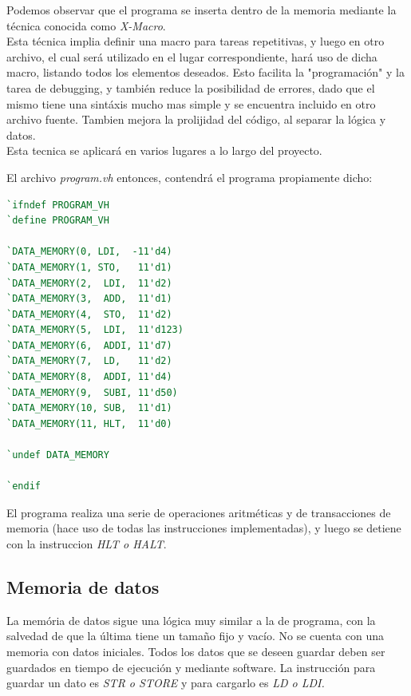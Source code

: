 \documentclass{article}
\begin{document}
\newpage

Podemos observar que el programa se inserta dentro de la memoria mediante la técnica conocida como \textit{X-Macro}. \\
Esta técnica implia definir una macro para tareas repetitivas, y luego en otro archivo, el cual
será utilizado en el lugar correspondiente, hará uso de dicha macro, listando todos los elementos deseados.
Esto facilita la "programación" y la tarea de debugging, y también reduce la posibilidad de errores,
dado que el mismo tiene una sintáxis mucho mas simple y se encuentra incluido en otro archivo fuente.
Tambien mejora la prolijidad del código, al separar la lógica y datos. \\

Esta tecnica se aplicará en varios lugares a lo largo del proyecto.

El archivo \textit{program.vh} entonces, contendrá el programa propiamente dicho:

\begin{shaded}
\begin{lstlisting}[language=Verilog]
`ifndef PROGRAM_VH
`define PROGRAM_VH

`DATA_MEMORY(0, LDI,  -11'd4)
`DATA_MEMORY(1, STO,   11'd1)
`DATA_MEMORY(2,  LDI,  11'd2)
`DATA_MEMORY(3,  ADD,  11'd1)
`DATA_MEMORY(4,  STO,  11'd2)
`DATA_MEMORY(5,  LDI,  11'd123)
`DATA_MEMORY(6,  ADDI, 11'd7)
`DATA_MEMORY(7,  LD,   11'd2)
`DATA_MEMORY(8,  ADDI, 11'd4)
`DATA_MEMORY(9,  SUBI, 11'd50)
`DATA_MEMORY(10, SUB,  11'd1)
`DATA_MEMORY(11, HLT,  11'd0)

`undef DATA_MEMORY

`endif
\end{lstlisting}
\end{shaded}


El programa realiza una serie de operaciones aritméticas y de transacciones de memoria
(hace uso de todas las instrucciones implementadas), y luego se detiene con la instruccion \textit{HLT o HALT}.

\newpage

\subsection{Memoria de datos}

La memória de datos sigue una lógica muy similar a la de programa, con la salvedad de que la última tiene
un tamaño fijo y vacío. No se cuenta con una memoria con datos iniciales. Todos los datos que se deseen
guardar deben ser guardados en tiempo de ejecución y mediante software. La instrucción para guardar un dato
es \textit{STR o STORE} y para cargarlo es \textit{LD o LDI.}
\end{document}
